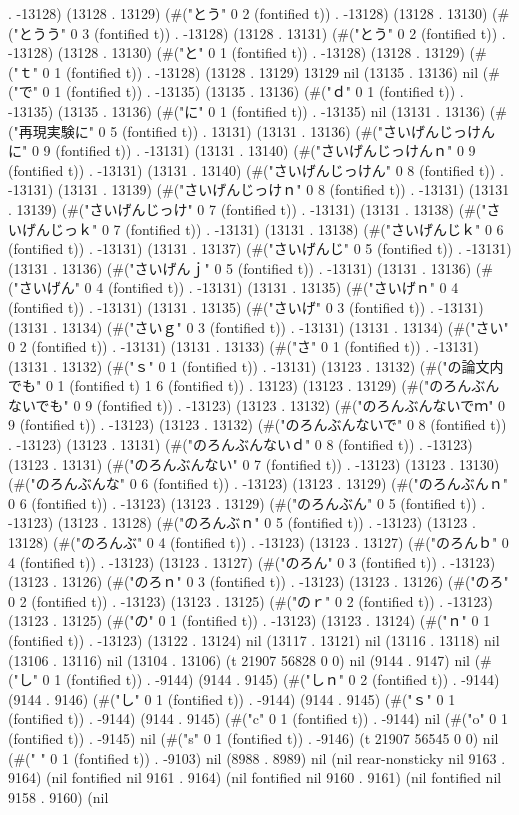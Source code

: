 . -13128) (13128 . 13129) (#("とう" 0 2 (fontified t)) . -13128) (13128 . 13130) (#("とうう" 0 3 (fontified t)) . -13128) (13128 . 13131) (#("とう" 0 2 (fontified t)) . -13128) (13128 . 13130) (#("と" 0 1 (fontified t)) . -13128) (13128 . 13129) (#("ｔ" 0 1 (fontified t)) . -13128) (13128 . 13129) 13129 nil (13135 . 13136) nil (#("で" 0 1 (fontified t)) . -13135) (13135 . 13136) (#("ｄ" 0 1 (fontified t)) . -13135) (13135 . 13136) (#("に" 0 1 (fontified t)) . -13135) nil (13131 . 13136) (#("再現実験に" 0 5 (fontified t)) . 13131) (13131 . 13136) (#("さいげんじっけんに" 0 9 (fontified t)) . -13131) (13131 . 13140) (#("さいげんじっけんｎ" 0 9 (fontified t)) . -13131) (13131 . 13140) (#("さいげんじっけん" 0 8 (fontified t)) . -13131) (13131 . 13139) (#("さいげんじっけｎ" 0 8 (fontified t)) . -13131) (13131 . 13139) (#("さいげんじっけ" 0 7 (fontified t)) . -13131) (13131 . 13138) (#("さいげんじっｋ" 0 7 (fontified t)) . -13131) (13131 . 13138) (#("さいげんじｋ" 0 6 (fontified t)) . -13131) (13131 . 13137) (#("さいげんじ" 0 5 (fontified t)) . -13131) (13131 . 13136) (#("さいげんｊ" 0 5 (fontified t)) . -13131) (13131 . 13136) (#("さいげん" 0 4 (fontified t)) . -13131) (13131 . 13135) (#("さいげｎ" 0 4 (fontified t)) . -13131) (13131 . 13135) (#("さいげ" 0 3 (fontified t)) . -13131) (13131 . 13134) (#("さいｇ" 0 3 (fontified t)) . -13131) (13131 . 13134) (#("さい" 0 2 (fontified t)) . -13131) (13131 . 13133) (#("さ" 0 1 (fontified t)) . -13131) (13131 . 13132) (#("ｓ" 0 1 (fontified t)) . -13131) (13123 . 13132) (#("の論文内でも" 0 1 (fontified t) 1 6 (fontified t)) . 13123) (13123 . 13129) (#("のろんぶんないでも" 0 9 (fontified t)) . -13123) (13123 . 13132) (#("のろんぶんないでｍ" 0 9 (fontified t)) . -13123) (13123 . 13132) (#("のろんぶんないで" 0 8 (fontified t)) . -13123) (13123 . 13131) (#("のろんぶんないｄ" 0 8 (fontified t)) . -13123) (13123 . 13131) (#("のろんぶんない" 0 7 (fontified t)) . -13123) (13123 . 13130) (#("のろんぶんな" 0 6 (fontified t)) . -13123) (13123 . 13129) (#("のろんぶんｎ" 0 6 (fontified t)) . -13123) (13123 . 13129) (#("のろんぶん" 0 5 (fontified t)) . -13123) (13123 . 13128) (#("のろんぶｎ" 0 5 (fontified t)) . -13123) (13123 . 13128) (#("のろんぶ" 0 4 (fontified t)) . -13123) (13123 . 13127) (#("のろんｂ" 0 4 (fontified t)) . -13123) (13123 . 13127) (#("のろん" 0 3 (fontified t)) . -13123) (13123 . 13126) (#("のろｎ" 0 3 (fontified t)) . -13123) (13123 . 13126) (#("のろ" 0 2 (fontified t)) . -13123) (13123 . 13125) (#("のｒ" 0 2 (fontified t)) . -13123) (13123 . 13125) (#("の" 0 1 (fontified t)) . -13123) (13123 . 13124) (#("ｎ" 0 1 (fontified t)) . -13123) (13122 . 13124) nil (13117 . 13121) nil (13116 . 13118) nil (13106 . 13116) nil (13104 . 13106) (t 21907 56828 0 0) nil (9144 . 9147) nil (#("し" 0 1 (fontified t)) . -9144) (9144 . 9145) (#("しｎ" 0 2 (fontified t)) . -9144) (9144 . 9146) (#("し" 0 1 (fontified t)) . -9144) (9144 . 9145) (#("ｓ" 0 1 (fontified t)) . -9144) (9144 . 9145) (#("c" 0 1 (fontified t)) . -9144) nil (#("o" 0 1 (fontified t)) . -9145) nil (#("s" 0 1 (fontified t)) . -9146) (t 21907 56545 0 0) nil (#(" " 0 1 (fontified t)) . -9103) nil (8988 . 8989) nil (nil rear-nonsticky nil 9163 . 9164) (nil fontified nil 9161 . 9164) (nil fontified nil 9160 . 9161) (nil fontified nil 9158 . 9160) (nil 
